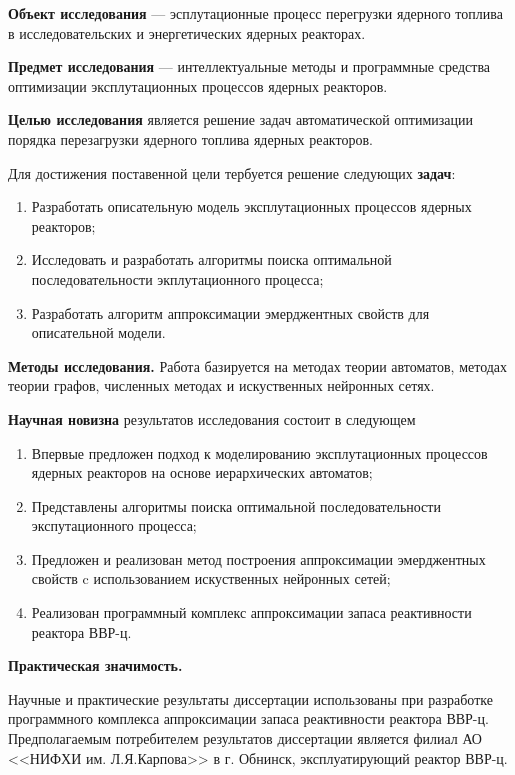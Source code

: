 \textbf{Объект исследования} --- эсплутационные процесс перегрузки ядерного топлива в исследовательских и энергетических ядерных реакторах.

\textbf{Предмет исследования} --- интеллектуальные методы и программные средства оптимизации эксплутационных процессов ядерных реакторов.

\textbf{Целью исследования} является решение задач автоматической оптимизации порядка перезагрузки ядерного топлива ядерных реакторов.

Для достижения поставенной цели тербуется решение следующих \textbf{задач}:

\begin{enumerate}
    \item Разработать описательную модель эксплутационных процессов ядерных реакторов;
    \item Исследовать и разработать алгоритмы поиска оптимальной последовательности экплутационного процесса;
    \item Разработать алгоритм аппроксимации эмерджентных свойств для описательной модели.
\end{enumerate}

\textbf{Методы исследования.} 
Работа базируется на методах теории автоматов, методах теории графов, численных методах и искуственных нейронных сетях.

\textbf{Научная новизна} результатов исследования состоит в следующем
\begin{enumerate}
    \item Впервые предложен подход к моделированию эксплутационных процессов ядерных реакторов на основе иерархических автоматов;
    \item Представлены алгоритмы поиска оптимальной последовательности экспутационного процесса;
    \item Предложен и реализован метод построения аппроксимации эмерджентных свойств c использованием искуственных нейронных сетей;
    \item Реализован программный комплекс аппроксимации запаса реактивности реактора ВВР-ц.
\end{enumerate}

\textbf{Практическая значимость. }

Научные и практические результаты диссертации использованы при разработке программного комплекса аппроксимации запаса реактивности реактора ВВР-ц.
Предполагаемым потребителем результатов диссертации является филиал АО <<НИФХИ им. Л.Я.Карпова>> в г. Обнинск, эксплуатирующий реактор ВВР-ц.

